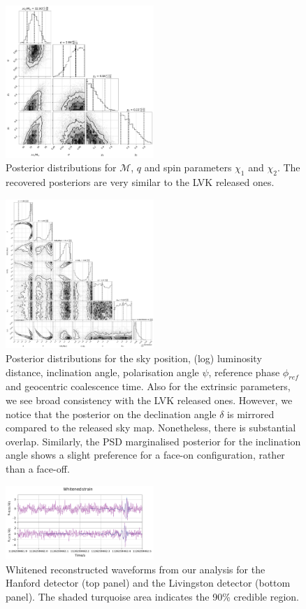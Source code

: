 \documentclass{aa}
\begin{document}
\begin{figure}
	\caption{Posterior distributions for $\mathcal{M}$, $q$ and spin parameters $\chi_1$ and $\chi_2$. The recovered posteriors are very similar to the LVK released ones.}
	\label{fig:gw150914_intrinsic}
	\includegraphics[width=0.5\textwidth,keepaspectratio]{Images/gw150914/intrinsic.pdf}
\end{figure}
\begin{figure}
	\caption{Posterior distributions for the sky position, (log) luminosity distance, inclination angle, polarisation angle $\psi$, reference phase $\phi_{ref}$ and geocentric coalescence time. Also for the extrinsic parameters, we see broad consistency with the LVK released ones. However, we notice that the posterior on the declination angle $\delta$ is mirrored compared to the released sky map. Nonetheless, there is substantial overlap. Similarly, the PSD marginalised posterior for the inclination angle shows a slight preference for a face-on configuration, rather than a face-off.}
	\label{fig:gw150914_extrinsic}
	\includegraphics[width=0.5\textwidth,keepaspectratio]{Images/gw150914/extrinsic.pdf}
\end{figure}
\begin{figure}
	\caption{Whitened reconstructed waveforms from our analysis for the Hanford detector (top panel) and the Livingston detector (bottom panel). The shaded turquoise area indicates the 90\% credible region.}
	\label{fig:gw150914_waveforms}
	\includegraphics[width=0.5\textwidth,keepaspectratio]{Images/gw150914/waveforms.pdf}
\end{figure}
\end{document}
